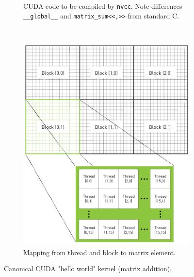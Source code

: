 \begin{figure}
    \centering
    \begin{subfigure}{\linewidth}
        \centering
        \caption{CUDA code to be compiled by \texttt{nvcc}.
        Note differences \texttt{__global__} and \texttt{matrix_sum<<,>>} from standard C.
        }
        \label{lst:cuda_hello_world}
    \end{subfigure}
    \\[3ex]
    \begin{subfigure}{\linewidth}
        \centering
        \includegraphics[width=\linewidth]{figures/matrix_thread.png}
        \caption{Mapping from thread and block to matrix element.}
        \label{fig:matrix_thread}
    \end{subfigure}
    \caption{Canonical CUDA "hello world" kernel (matrix addition).}
    \label{fig:cuda_hello_world}
\end{figure}
